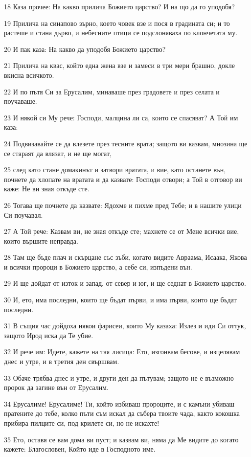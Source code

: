 \par 18 Каза прочее: На какво прилича Божието царство? И на що да го уподобя?
\par 19 Прилича на синапово зърно, което човек взе и пося в градината си; и то растеше и стана дърво, и небесните птици се подслоняваха по клончетата му.
\par 20 И пак каза: На какво да уподобя Божието царство?
\par 21 Прилича на квас, който една жена взе и замеси в три мери брашно, докле вкисна всичкото.
\par 22 И по пътя Си за Ерусалим, минаваше през градовете и през селата и поучаваше.
\par 23 И някой си Му рече: Господи, малцина ли са, които се спасяват? А Той им каза:
\par 24 Подвизавайте се да влезете през тесните врата; защото ви казвам, мнозина ще се стараят да влязат, и не ще могат,
\par 25 след като стане домакинът и затвори вратата, и вие, като останете вън, почнете да хлопате на вратата и да казвате: Господи отвори; а Той в отговор ви каже: Не ви зная откъде сте.
\par 26 Тогава ще почнете да казвате: Ядохме и пихме пред Тебе; и в нашите улици Си поучавал.
\par 27 А Той рече: Казвам ви, не зная откъде сте; махнете се от Мене всички вие, които вършите неправда.
\par 28 Там ще бъде плач и скърцане със зъби, когато видите Авраама, Исаака, Якова и всички пророци в Божието царство, а себе си, изпъдени вън.
\par 29 И ще дойдат от изток и запад, от север и юг, и ще седнат в Божието царство.
\par 30 И, ето, има последни, които ще бъдат първи, и има първи, които ще бъдат последни.
\par 31 В същия час дойдоха някои фарисеи, които Му казаха: Излез и иди Си оттук, защото Ирод иска да Те убие.
\par 32 И рече им: Идете, кажете на тая лисица: Ето, изгонвам бесове, и изцелявам днес и утре, и в третия ден свършвам.
\par 33 Обаче трябва днес и утре, и други ден да пътувам; защото не е възможно пророк да загине вън от Ерусалим.
\par 34 Ерусалиме! Ерусалиме! Ти, който избиваш пророците, и с камъни убиваш пратените до тебе, колко пъти съм искал да събера твоите чада, както кокошка прибира пилците си, под крилете си, но не искахте!
\par 35 Ето, оставя се вам дома ви пуст; и казвам ви, няма да Ме видите до когато кажете: Благословен, Който иде в Господното име.


